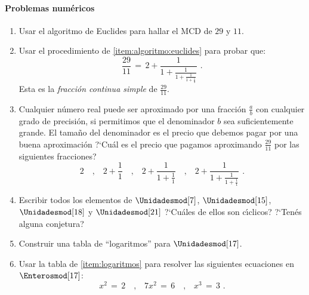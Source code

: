 \paragraph{Problemas num\'ericos}
\begin{enumerate}[label=P\arabic*]
	\conti
	\item\label{item:algoritmo:euclides}
		Usar el algoritmo de Euclides para hallar el MCD de $29$ y $11$.
	\item\label{item:algoritmo:continua:racional}
		Usar el procedimiento de \ref{item:algoritmo:euclides}
		para probar que:
    		\begin{displaymath}
			\frac{29}{11}\,=\,2+\frac 1 {1+\frac 1 {1+\frac 1 {1+\frac 1 {3}}}}
			\text{ .}
		\end{displaymath}
    		Esta es la \emph{fracci\'on continua simple} de $\frac{29}{11}$.
	\item\label{item:algoritmo:continua:real}
		Cualquier n\'umero real puede ser aproximado por una fracci\'on
		$\frac{a}{b}$ con cualquier grado de precisi\'on, si permitimos que el denominador
		$b$ sea suficientemente grande.
		El tama\~no del denominador es el precio que debemos pagar por una buena aproximaci\'on
		?`Cu\'al es el precio que pagamos aproximando $\frac{29}{11}$ por las siguientes fracciones?
    		\begin{displaymath}
			2\quad\text{,}\quad
			2+\frac{1}{1}\quad\text{,}\quad
			2+\frac{1}{1+\frac{1}{1}}\quad\text{,}\quad
			2+\frac{1}{1+\frac{1}{1+\frac{1}{1}}}
			\text{ .}
		\end{displaymath}
	\item\label{item:unidades}
		Escribir todos los elementos de $\Unidadesmod[7]$, $\Unidadesmod[15]$, $\Unidadesmod[18]$ y
		$\Unidadesmod[21]$ ?`Cu\'ales de ellos son c\'{\i}clicos? ?`Ten\'es alguna conjetura?
	\item\label{item:logaritmos}
		Construir una tabla de ``logaritmos'' para $\Unidadesmod[17]$.
	\item\label{item:logaritmos:ecuaciones}
		Usar la tabla de \ref{item:logaritmos} para resolver las siguientes
		ecuaciones en $\Enterosmod[17]$:
		\begin{displaymath}
			x^2\,=\,2\quad\text{,}\quad
			7x^2\,=\,6\quad\text{,}\quad
			x^3\,=\,3\text{ .}
		\end{displaymath}

\end{enumerate}
